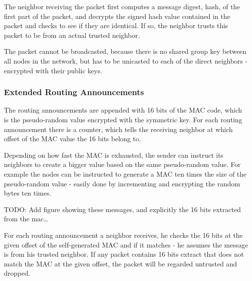 The neighbor receiving the packet first computes a message digest, hash, of the
first part of the packet, and decrypts the signed hash value contained in the
packet and checks to see if they are identical. If so, the neighbor trusts this
packet to be from an actual trusted neighbor.

The packet cannot be broadcasted, because there is no shared group key between
all nodes in the network, but has to be unicasted to each of the direct
neighbors - encrypted with their public keys.

\subsubsection*{Extended Routing Announcements}

The routing announcements are appended with 16 bits of the \ac{MAC} code, which
is the pseudo-random value encrypted with the symmetric key. For each routing
announcement there is a counter, which tells the receiving neighbor at which
offset of the \ac{MAC} value the 16 bits belong to.

Depending on how fast the \ac{MAC} is exhausted, the sender can instruct its
neighbors to create a bigger value based on the same pseudo-random value. For
example the nodes can be instructed to generate a \ac{MAC} ten times the size of
the pseudo-random value - easily done by incrementing and encrypting the random
bytes ten times.

TODO: Add figure showing these messages, and explicitly the 16 bits extracted
from the mac\ldots

For each routing announcement a neighbor receives, he checks the 16 bits at the
given offset of the self-generated \ac{MAC} and if it matches - he assumes the
message is from his trusted neighbor. If any packet contains 16 bits extract
that does not match the \ac{MAC} at the given offset, the packet will be
regarded untrusted and dropped.

